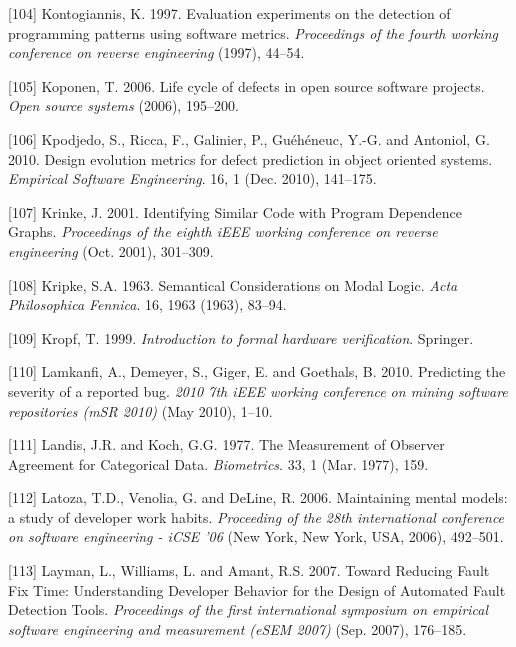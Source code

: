 \documentclass[12pt]{report}
\begin{document}
\hypertarget{ref-Kontogiannis}{}
{[}104{]} Kontogiannis, K. 1997. Evaluation experiments on the detection
of programming patterns using software metrics. \emph{Proceedings of the
fourth working conference on reverse engineering} (1997), 44--54.

\hypertarget{ref-Koponen2006}{}
{[}105{]} Koponen, T. 2006. Life cycle of defects in open source
software projects. \emph{Open source systems} (2006), 195--200.

\hypertarget{ref-Kpodjedo2010}{}
{[}106{]} Kpodjedo, S., Ricca, F., Galinier, P., Guéhéneuc, Y.-G. and
Antoniol, G. 2010. Design evolution metrics for defect prediction in
object oriented systems. \emph{Empirical Software Engineering}. 16, 1
(Dec. 2010), 141--175.

\hypertarget{ref-Krinke2001}{}
{[}107{]} Krinke, J. 2001. Identifying Similar Code with Program
Dependence Graphs. \emph{Proceedings of the eighth iEEE working
conference on reverse engineering} (Oct. 2001), 301--309.

\hypertarget{ref-Kripke1963}{}
{[}108{]} Kripke, S.A. 1963. Semantical Considerations on Modal Logic.
\emph{Acta Philosophica Fennica}. 16, 1963 (1963), 83--94.

\hypertarget{ref-kropf1999introduction}{}
{[}109{]} Kropf, T. 1999. \emph{Introduction to formal hardware
verification}. Springer.

\hypertarget{ref-Lamkanfi2010}{}
{[}110{]} Lamkanfi, A., Demeyer, S., Giger, E. and Goethals, B. 2010.
Predicting the severity of a reported bug. \emph{2010 7th iEEE working
conference on mining software repositories (mSR 2010)} (May 2010),
1--10.

\hypertarget{ref-Landis1977}{}
{[}111{]} Landis, J.R. and Koch, G.G. 1977. The Measurement of Observer
Agreement for Categorical Data. \emph{Biometrics}. 33, 1 (Mar. 1977),
159.

\hypertarget{ref-LaToza2006}{}
{[}112{]} Latoza, T.D., Venolia, G. and DeLine, R. 2006. Maintaining
mental models: a study of developer work habits. \emph{Proceeding of the
28th international conference on software engineering - iCSE '06} (New
York, New York, USA, 2006), 492--501.

\hypertarget{ref-Layman2007}{}
{[}113{]} Layman, L., Williams, L. and Amant, R.S. 2007. Toward Reducing
Fault Fix Time: Understanding Developer Behavior for the Design of
Automated Fault Detection Tools. \emph{Proceedings of the first
international symposium on empirical software engineering and
measurement (eSEM 2007)} (Sep. 2007), 176--185.
\end{document}
